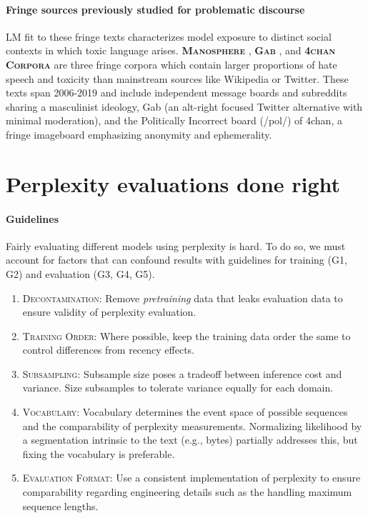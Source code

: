 \paragraph{Fringe sources previously studied for problematic discourse} LM fit to these fringe texts characterizes model exposure to distinct social contexts in which toxic language arises.
\textbf{\textsc{Manosphere}} \citep{Horta_Ribeiro_2021}, \textbf{\textsc{Gab}} \citep{ZannettouGab}, and \textbf{\textsc{4chan Corpora}} \citep{Papasavva_2020} are three fringe corpora which contain larger proportions of hate speech and toxicity than mainstream sources like Wikipedia or Twitter. These texts span 2006-2019 and include independent message boards and subreddits sharing a masculinist ideology, Gab (an alt-right focused Twitter alternative with minimal moderation), and the Politically Incorrect board (/pol/) of 4chan, a fringe imageboard emphasizing anonymity and ephemerality.

\section{Perplexity evaluations done right}
\label{sec:guidelines}
\label{sec:submission_tracks} 

\paragraph{Guidelines}
Fairly evaluating different models using perplexity is hard. To do so, we must account for factors that can confound results with guidelines for training (\textsc{G1}, \textsc{G2}) and evaluation (\textsc{G3}, \textsc{G4}, \textsc{G5}).

\begin{enumerate}[label=\textsc{G\arabic*}]
    \item \textsc{Decontamination}: Remove \textit{pretraining} data that leaks evaluation data to ensure validity of perplexity evaluation. 
    \item \textsc{Training Order}: Where possible, keep the training data order the same to control differences from recency effects.
    \item \textsc{Subsampling}: Subsample size poses a tradeoff between inference cost and variance. Size subsamples to tolerate variance equally for each domain.
    \item \textsc{Vocabulary}: Vocabulary determines the event space of possible sequences and the comparability of perplexity measurements. Normalizing likelihood by a segmentation intrinsic to the text (e.g., bytes) partially addresses this, but fixing the vocabulary is preferable.
    \item  \textsc{Evaluation Format}: Use a consistent implementation of perplexity to ensure comparability regarding engineering details such as the handling maximum sequence lengths.
\end{enumerate}

